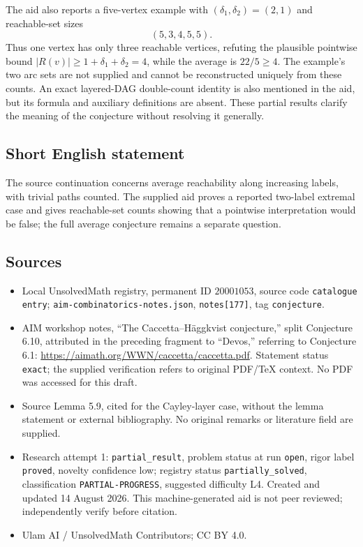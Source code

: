 \documentclass[11pt]{article}
\begin{document}
The aid also reports a five-vertex example with \((\delta_1,\delta_2)=(2,1)\) and reachable-set sizes
\[
 (5,3,4,5,5).
\]
Thus one vertex has only three reachable vertices, refuting the plausible pointwise bound \(|R(v)|\ge1+\delta_1+\delta_2=4\), while the average is \(22/5\ge4\). The example's two arc sets are not supplied and cannot be reconstructed uniquely from these counts. An exact layered-DAG double-count identity is also mentioned in the aid, but its formula and auxiliary definitions are absent. These partial results clarify the meaning of the conjecture without resolving it generally.
\subsection{Short English statement}
The source continuation concerns average reachability along increasing labels, with trivial paths counted. The supplied aid proves a reported two-label extremal case and gives reachable-set counts showing that a pointwise interpretation would be false; the full average conjecture remains a separate question.
\subsection{Sources}
\begin{itemize}
\item Local UnsolvedMath registry, permanent ID \(20001053\), source code \texttt{catalogue entry}; \texttt{aim-combinatorics-notes.json}, \texttt{notes[177]}, tag \texttt{conjecture}.
\item AIM workshop notes, ``The Caccetta--H\"aggkvist conjecture,'' split Conjecture 6.10, attributed in the preceding fragment to ``Devos,'' referring to Conjecture 6.1: \url{https://aimath.org/WWN/caccetta/caccetta.pdf}. Statement status \texttt{exact}; the supplied verification refers to original PDF/TeX context. No PDF was accessed for this draft.
\item Source Lemma 5.9, cited for the Cayley-layer case, without the lemma statement or external bibliography. No original remarks or literature field are supplied.
\item Research attempt 1: \texttt{partial\_result}, problem status at run \texttt{open}, rigor label \texttt{proved}, novelty confidence low; registry status \texttt{partially\_solved}, classification \texttt{PARTIAL-PROGRESS}, suggested difficulty L4. Created and updated 14 August 2026. This machine-generated aid is not peer reviewed; independently verify before citation.
\item Ulam AI / UnsolvedMath Contributors; CC BY 4.0.
\end{itemize}
\end{document}
